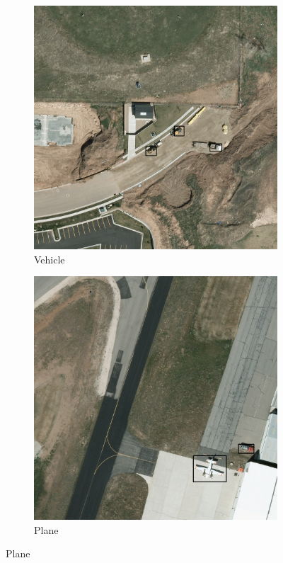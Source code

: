 \begin{figure}[h!]
    \begin{subfigure}[t]{0.38\textwidth}
        \centering
        \includegraphics[width=\linewidth]{images/015Results/01abb_vs_obb/comp_images/ground_truth_abb/427.png}
        \caption{Vehicle}
    \end{subfigure}
    \begin{subfigure}[t]{0.38\textwidth}
        \centering
        \includegraphics[width=\linewidth]{images/015Results/01abb_vs_obb/comp_images/ground_truth_abb/487.png}
        \caption{Plane}
    \end{subfigure}
    

\end{figure}

